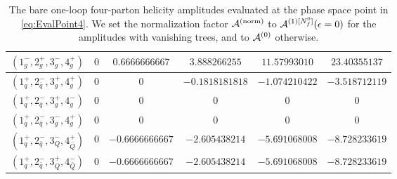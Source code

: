 \begin{table}[h]
\begin{adjustbox}{width=1\textwidth}
\begin{tabular}{cccccc}
      $(1_g^-,2_g^+,3_g^-,4_g^+)$ & $0$ & $0.6666666667$ &
      $3.888266255$ & $11.57993010$ & $23.40355137$ \\
      \midrule
      $(1_q^+,2_{\bar q}^-,3_g^+,4_g^+)$ & $0$ & $0$ &
      $-0.1818181818$ & $-1.074210422$ & $-3.518712119$ \\
      $(1_q^+,2_{\bar q}^-,3_g^+,4_g^-)$ & $0$ & $0$ & $0$ & $0$ & $0$ \\
      $(1_q^+,2_{\bar q}^-,3_g^-,4_g^+)$ & $0$ & $0$ & $0$ & $0$ & $0$ \\
      \midrule
      $(1_q^+,2_{\bar q}^-,3_Q^-,4_{\bar Q}^+)$ & $0$ &
      $-0.6666666667$ & $-2.605438214$ & $-5.691068008$ &
      $-8.728233619$ \\
      $(1_q^+,2_{\bar q}^-,3_Q^+,4_{\bar Q}^-)$ & $0$ &
      $-0.6666666667$ & $-2.605438214$ & $-5.691068008$ &
      $-8.728233619$ \\
      \bottomrule
    \end{tabular}
  \end{adjustbox}
\caption{The bare one-loop four-parton helicity amplitudes 
  evaluated at the phase space point in \cref{eq:EvalPoint4}. We set the
    normalization factor $\mathcal{A}^\mathrm{(norm)}$ to $\mathcal{A}^{(1)[N_f^0]}(\epsilon=0)$ for the
    amplitudes with vanishing trees, and to $\mathcal{A}^{(0)}$ otherwise.}
  \label{tab:results4parton1L}
\end{table}

